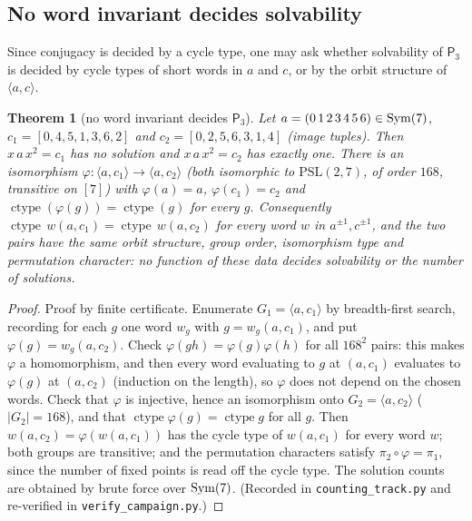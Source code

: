 \documentclass[preprint,12pt]{elsarticle}
\newtheorem{thm}{Theorem}[section]\newtheorem{lem}[thm]{Lemma}\newtheorem{cor}[thm]{Corollary}\newtheorem{prop}[thm]{Proposition}
\theoremstyle{definition}\newtheorem{defi}[thm]{Definition}\newtheorem{prob}[thm]{Problem}\newtheorem{obs}[thm]{Observation}
\theoremstyle{remark}\newtheorem{rem}[thm]{Remark}
\newcommand{\ctype}{\operatorname{ctype}}\DeclareMathOperator{\Cent}{C}\DeclareMathOperator{\supp}{supp}
\newcommand{\Pthree}{\mathsf{P}_3}\newcommand{\Conj}[1]{\mathsf{Conj}_{#1}}\newcommand{\Dzero}{\Conj{3}}\newcommand{\TR}{T_{\mathcal R}}
\begin{document}
\subsection{No word invariant decides solvability}

Since conjugacy is decided by a cycle type, one may ask whether solvability of $\Pthree$ is decided by cycle types of short words in $a$ and $c$, or by the orbit structure of $\langle a,c\rangle$.

\begin{thm}[no word invariant decides $\Pthree$]\label{thm:psl}
Let $a=(0\,1\,2\,3\,4\,5\,6)\in\operatorname{Sym}(7)$, $c_1=[0,4,5,1,3,6,2]$ and $c_2=[0,2,5,6,3,1,4]$ (image tuples). Then $x\,a\,x^{2}=c_1$ has no solution
and $x\,a\,x^{2}=c_2$ has exactly one. There is an isomorphism $\varphi:\langle a,c_1\rangle\to\langle a,c_2\rangle$ (both isomorphic to
$\mathrm{PSL}(2,7)$, of order $168$, transitive on $[7]$) with $\varphi(a)=a$, $\varphi(c_1)=c_2$ and $\ctype(\varphi(g))=\ctype(g)$ for every $g$.
Consequently $\ctype\,w(a,c_1)=\ctype\,w(a,c_2)$ for \emph{every} word $w$ in $a^{\pm1},c^{\pm1}$, and the two pairs have the same orbit
structure, group order, isomorphism type and permutation character: no function of these data decides solvability or the number of solutions.
\end{thm}
\begin{proof}
Proof by finite certificate. Enumerate $G_1=\langle a,c_1\rangle$ by breadth-first search, recording for each $g$ one word $w_g$ with
$g=w_g(a,c_1)$, and put $\varphi(g)=w_g(a,c_2)$. Check $\varphi(gh)=\varphi(g)\varphi(h)$ for all $168^{2}$ pairs: this makes $\varphi$ a
homomorphism, and then every word evaluating to $g$ at $(a,c_1)$ evaluates to $\varphi(g)$ at $(a,c_2)$ (induction on the length), so
$\varphi$ does not depend on the chosen words. Check that $\varphi$ is injective, hence an isomorphism onto $G_2=\langle a,c_2\rangle$
($|G_2|=168$), and that $\ctype\varphi(g)=\ctype g$ for all $g$. Then $w(a,c_2)=\varphi(w(a,c_1))$ has the cycle type of $w(a,c_1)$ for
every word $w$; both groups are transitive; and the permutation characters satisfy $\pi_2\circ\varphi=\pi_1$, since the number of fixed
points is read off the cycle type. The solution counts are obtained by brute force over $\operatorname{Sym}(7)$. (Recorded in \texttt{counting\_track.py} and re-verified in \texttt{verify\_campaign.py}.)
\end{proof}
\end{document}
